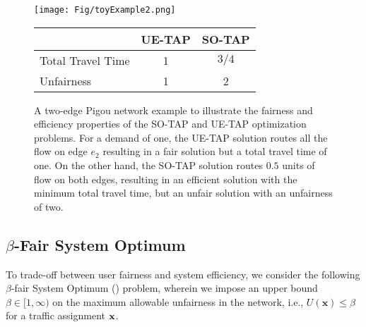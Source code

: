 \documentclass{article}
\newif\ifarxiv   %
\begin{document}
\begin{figure}[!h] 
    \begin{minipage}{0.4\linewidth}
		\centering
		\texttt{[image: Fig/toyExample2.png]}
	\end{minipage} \hspace{15pt}
	\begin{minipage}{0.5\linewidth}
		\small
		\label{table:student}
		\centering
		\begin{tabular}[b]{lcc}\hline
      & UE-TAP & SO-TAP  \\ \hline
      Total Travel Time & 1 & $3/4$ \\
      Unfairness & 1 & 2 \\ \hline
    \end{tabular}
	\end{minipage}\hfill
	\caption{A two-edge Pigou network example to illustrate the fairness and efficiency properties of the SO-TAP and UE-TAP optimization problems. For a demand of one, the UE-TAP solution routes all the flow on edge $e_2$ resulting in a fair solution but a total travel time of one. On the other hand, the SO-TAP solution routes $0.5$ units of flow on both edges, resulting in an efficient solution with the minimum total travel time, but an unfair solution with an unfairness of two.} 
	\label{fig:toy}
  \end{figure}




\subsection{$\beta$-Fair System Optimum} \label{sec:beta-so}

\ifarxiv
Our focus in this work is in solving the following problem where we impose an upper bound on the maximum allowable level of unfairness in the network. In particular, for an unfairness parameter $\beta \in [1, \infty)$, any feasible path flow $\f$ must satisfy $U(\f) \leq \beta$. To trade-off between user fairness and system efficiency, we consider the following $\beta$-fair System Optimum (\fso) problem.
\else
To trade-off between user fairness and system efficiency, we consider the following $\beta$-fair System Optimum (\fso) problem, wherein we impose an upper bound $\beta \in [1, \infty)$ on the maximum allowable unfairness in the network, i.e., $U(\mathbf{x}) \leq \beta$ for a traffic assignment $\mathbf{x}$.
\fi
\end{document}
